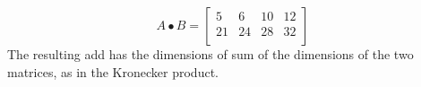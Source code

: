 \[
    A \bullet B = \begin{bmatrix}
        5  & 6  & 10 & 12 \\
        21 & 24 & 28 & 32 \\
    \end{bmatrix}
\]
The resulting \gls{add} has the dimensions of sum of the dimensions of the two matrices, as in the Kronecker product.



